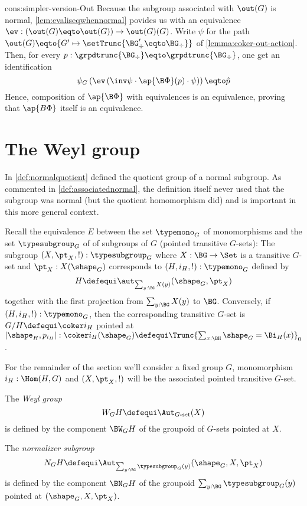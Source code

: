 \begin{implementation}{cons:simpler-version-Out}
  Because the subgroup associated with $\out(G)$ is normal,
  \cref{lem:evaliseqwhennormal} povides us with an equivalence
  $\ev : (\out(G) \eqto \out(G)) \to \out(G)(G)$. Write $\psi$ for the path
  $\out(G) \eqto {G' \mapsto \setTrunc{\BG'_\div \eqto \BG_\div}}$ of
  \cref{lemma:coker-out-action}. Then, for every
  $p:\grpdtrunc{\BG_\div} \eqto \grpdtrunc{\BG_\div}$, one get an identification
  \begin{displaymath}
    \psi_G \left(
      \ev \left( \inv\psi \cdot \ap{\B\Phi} (p) \cdot \psi \right)
    \right) \eqto \hat p
  \end{displaymath}
  Hence, composition of $\ap{\B\Phi}$ with equivalences is an equivalence,
  proving that $\ap{B\Phi}$ itself is an equivalence.
\end{implementation}


\section{The Weyl group}
\label{sec:Weyl}

In \cref{def:normalquotient} defined the quotient group of a normal subgroup.
As commented in \cref{def:associatednormal}, the definition itself never used that the subgroup was normal (but the quotient homomorphism did) and is important in this more general context.

Recall the equivalence $E$ between the set $\typemono_G$ of monomorphisms and the set $\typesubgroup_G$ of of subgroups of $G$ (pointed transitive $G$-sets): The subgroup $(X,\pt_X,!):\typesubgroup_G$ where $X:\BG\to\Set$ is a transitive $G$-set and $\pt_X:X(\shape_G)$ corresponds to $(H,i_H,!):\typemono_G$ defined by
$$H\defequi\aut_{\sum_{y:\BG}X(y)}(\shape_G,\pt_X)
$$ together with the first projection from $\sum_{y:\BG}X(y)$ to $\BG$.  Conversely, if $(H,i_H,!):\typemono_G$, then the corresponding transitive $G$-set is $G/H\defequi\coker i_H$ pointed at $|\shape_H,p_{i_H}|:\coker i_H(\shape_G)\defequi\Trunc{\sum_{x:\BH}\shape_G=\Bi_H(x)}_0$.

For the remainder of the section we'll consider a fixed group $G$, monomorphism $i_H:\Hom(H,G)$ and $(X,\pt_X,!)$ will be the associated pointed transitive $G$-set.
\begin{definition}

The \emph{Weyl group} \label{def:Weyl}
$$W_GH\defequi\Aut_{G\text{-set}}(X)$$ is defined by the component $\BW_GH$ of the groupoid of $G$-sets pointed at $X$.

The \emph{normalizer subgroup} \label{def:normalizer}
$$N_GH\defequi\Aut_{\sum_{y:\BG}\typesubgroup_G(y)}(\shape_G,X,\pt_X)$$ is defined by the component $\BN_GH$ of the groupoid $\sum_{y:\BG}\typesubgroup_G(y)$ pointed at $(\shape_G,X,\pt_X)$.
\end{definition}

